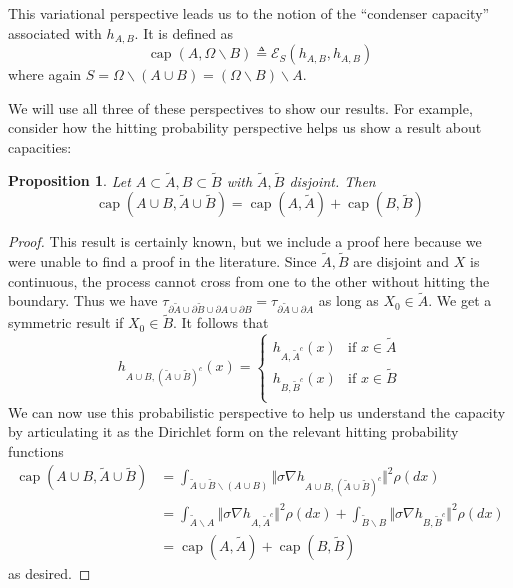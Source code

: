 \documentclass[12pt, nofootinbib,english, amsmath, amssymb, aps, priprint, graphicx,floatfix]{revtex4-1}
\newtheorem{proposition}{Proposition}
\theoremstyle{plain}
\theoremstyle{definition}
\theoremstyle{plain}
\newcommand{\capac}[2]{\ensuremath{\operatorname{cap}}(#1,#2)}
\begin{document}
{\begin{enumerate}
This variational perspective leads us to the notion of the ``condenser capacity'' associated with $h_{A,B}$.  It is defined as
    \[
    \capac{A}{\Omega \backslash B} \triangleq \mathscr{E}_S(h_{A,B},h_{A,B})
    \]
    where again $S=\Omega \backslash (A\cup B)=(\Omega \backslash B) \backslash A$.
\end{enumerate}
We will use all three of these perspectives to show our results.  For example, consider how the hitting probability perspective helps us show a result about capacities:
\begin{proposition}\label{prop:capacity}
Let $A\subset \tilde A,B\subset \tilde B$ with $\tilde A,\tilde B$ disjoint.  Then
\[
\capac{A\cup B}{\tilde A \cup \tilde B}=\capac{A}{\tilde A}+\capac{B}{\tilde B}
\]
\end{proposition}
\begin{proof}
This result is certainly known, but we include a proof here because we were unable to find a proof in the literature.  Since $\tilde A,\tilde B$ are disjoint and $X$ is continuous, the process cannot cross from one to the other without hitting the boundary.  Thus we have $\tau_{\partial \tilde A\cup \partial \tilde B \cup \partial A \cup \partial B}=\tau_{\partial \tilde A \cup \partial A}$ as long as $X_0\in\tilde A$.  We get a symmetric result if $X_0\in \tilde B$.  It follows that
\[
h_{A\cup B,(\tilde A\cup\tilde B)^c}(x) =
    \begin{cases}
    h_{A,\tilde A^c}(x) & \mbox{if }x\in \tilde A\\
    h_{B,\tilde B^c}(x) & \mbox{if }x\in \tilde B\\
    \end{cases}
\]
We can now use this probabilistic perspective to help us understand the capacity by articulating it as the Dirichlet form on the relevant hitting probability functions
\begin{align*}
\capac{A\cup B}{\tilde A \cup \tilde B}
        &= \int_{\tilde A\cup \tilde B \backslash (A\cup B)} \Vert \sigma \nabla h_{A\cup B,(\tilde A \cup \tilde B)^c}\Vert^2\rho(dx) \\
        &= \int_{\tilde A \backslash A} \Vert \sigma \nabla h_{A,\tilde A^c}\Vert^2\rho(dx)
            +\int_{\tilde B \backslash B} \Vert \sigma \nabla h_{B,\tilde B^c}\Vert^2 \rho(dx) \\
        &= \capac{A}{\tilde A}+\capac{B}{\tilde B}
\end{align*}
as desired.
\end{proof}

}
\end{document}

